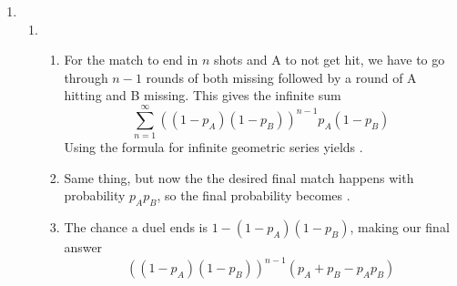 \documentclass[12pt]{article}
\begin{document}
\begin{enumerate}
      \item \begin{enumerate}
                  \item \begin{enumerate}
                              \item For the match to end in $n$ shots and A to not get hit,
                                    we have to go through $n-1$ rounds of both missing followed by
                                    a round of A hitting and B missing.
                                    This gives the infinite sum
                                    \[\sum_{n=1}^{\infty} \left(\left(1-p_A\right)\left(1-p_B\right)\right)^{n-1} p_A \left(1-p_B\right)\]
                                    Using the formula for infinite geometric series yields
                                    .
                              \item Same thing, but now the the desired final match happens with probability $p_A p_B$,
                                    so the final probability becomes .
                              \item The chance a duel ends is $1-(1-p_A)(1-p_B)$, making our final answer
                                    \[\boxed{((1-p_A)(1-p_B))^{n-1}(p_A+p_B-p_Ap_B)}\]


\end{enumerate}
\end{enumerate}
\end{enumerate}
\end{document}
